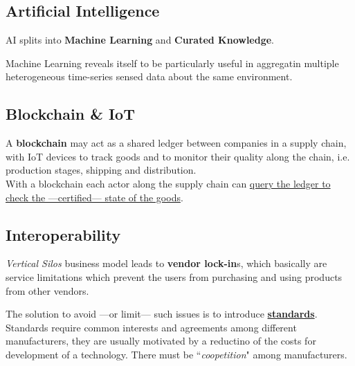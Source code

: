 \subsection{Artificial Intelligence}
AI splits into \textbf{Machine Learning} and \textbf{Curated Knowledge}.

Machine Learning reveals itself to be particularly useful in aggregatin multiple heterogeneous time-series sensed data about the same environment.


\subsection{Blockchain \& IoT}
A \textbf{blockchain} may act as a shared ledger between companies in a supply chain, with IoT devices to track goods and to monitor their quality along the chain, i.e. production stages, shipping and distribution.\\
With a blockchain each actor along the supply chain can \ul{query the ledger to check the ---certified--- state of the goods}.

\subsection{Interoperability}

\textit{Vertical Silos} business model leads to \textbf{vendor lock-in}s, which basically are service limitations which prevent the users from purchasing and using products from other vendors.
\nl
\nl

The solution to avoid ---or limit--- such issues is to introduce \ul{\textbf{standards}}.
Standards require common interests and agreements among different manufacturers, they are usually motivated by a reductino of the costs for development of a technology.
There must be ``\textit{coopetition}" among manufacturers.


